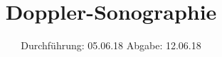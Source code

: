 

\subject{US3}
\title{Doppler-Sonographie}
\date{%
  Durchführung: 05.06.18
  \hspace{3em}
  Abgabe: 12.06.18
}



\maketitle
\thispagestyle{empty}
\tableofcontents
\newpage






\printbibliography{}


